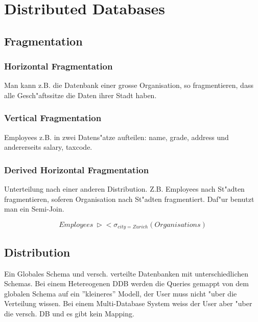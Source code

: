 \documentclass[german, 10pt, a4paper, twocolumn]{scrartcl}
\theoremstyle{definition}
\theoremstyle{remark}
\theoremstyle{example}
\begin{document}
\section{Distributed Databases}

\subsection{Fragmentation}

\subsubsection{Horizontal Fragmentation}

Man kann z.B. die Datenbank einer grosse Organisation, so fragmentieren, dass alle Gesch"aftssitze die Daten ihrer Stadt haben.

\subsubsection{Vertical Fragmentation}

Employees z.B. in zwei Datens"atze aufteilen: name, grade, address und andererseits salary, taxcode.

\subsubsection{Derived Horizontal Fragmentation}

Unterteilung nach einer anderen Distribution. Z.B. Employees nach St"adten fragmentieren, soferen Organisation nach St"adten fragmentiert. Daf"ur benutzt man ein Semi-Join.

\begin{displaymath}
	Employees \ \triangleright \! \! < \sigma_{city=Zurich}(Organisations)
\end{displaymath}


\subsection{Distribution}

Ein Globales Schema und versch. verteilte Datenbanken mit unterschiedlichen Schemas. Bei einem Hetereogenen DDB werden die Queries gemappt von dem globalen Schema auf ein ''kleineres'' Modell, der User muss nicht "uber die Verteilung wissen. Bei einem Multi-Database System weiss der User aber "uber die versch. DB und es gibt kein Mapping.

\appendix
\end{document}
